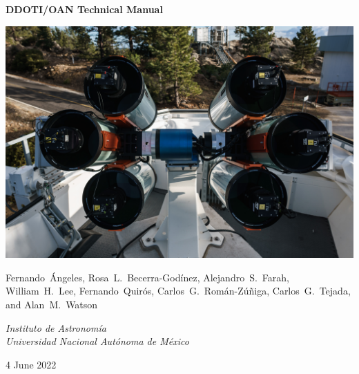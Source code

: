 \begin{centering}
{
 \Large
 \bfseries 
 DDOTI/OAN Technical Manual
 \par
}
\bigskip
\bigskip
\includegraphics[width=\linewidth]{figures/frontmatter-ddotioan.jpg}

\bigskip
\bigskip
{
\baselineskip=10pt
 \large
 Fernando~Ángeles,
 Rosa~L.~Becerra-Godínez,
 Alejandro~S.~Farah,
 William~H.~Lee,
 Fernando~Quirós,
 Carlos~G.~Román-Zúñiga,
 Carlos~G.~Tejada,
 and
 Alan~M.~Watson
 \par
}
\bigskip
{
 \large
 \itshape 
 Instituto de Astronomía\\
 Universidad Nacional Autónoma de México
 \par
}
\bigskip
{
 \large
 4 June 2022
}
\fi

\end{centering}

\newpage

\pagestyle{plain}


\tableofcontents

